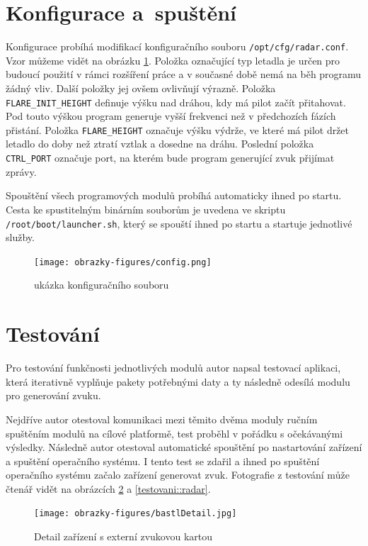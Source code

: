 	\section{Konfigurace a~spuštění}
	Konfigurace probíhá modifikací konfiguračního souboru \texttt{/opt/cfg/radar.conf}. Vzor můžeme vidět na obrázku \ref{implementace::config}. Položka označující typ letadla je určen pro budoucí použití v rámci rozšíření práce a v současné době nemá na běh programu žádný vliv. Další položky jej ovšem ovlivňují výrazně. Položka \texttt{FLARE\_INIT\_HEIGHT} definuje výšku nad dráhou, kdy má pilot začít přitahovat. Pod touto výškou program generuje vyšší frekvenci než v předchozích fázích přistání. Položka \texttt{FLARE\_HEIGHT} označuje výšku výdrže, ve které má pilot držet letadlo do doby než ztratí vztlak a dosedne na dráhu. Poslední položka \texttt{CTRL\_PORT} označuje port, na kterém bude program generující zvuk přijímat zprávy.\par
	Spouštění všech programových modulů probíhá automaticky ihned po startu. Cesta ke spustitelným binárním souborům je uvedena ve skriptu \texttt{/root/boot/launcher.sh}, který se spouští ihned po startu a startuje jednotlivé služby.
	
	\begin{figure}[H]
		\begin{center}
			\texttt{[image: obrazky-figures/config.png]}
			\caption{ukázka konfiguračního souboru}
			\label{implementace::config}
		\end{center}
	\end{figure}
	
	
	\section{Testování}
	Pro testování funkčnosti jednotlivých modulů autor napsal testovací aplikaci, která iterativně vyplňuje pakety potřebnými daty a ty následně odesílá modulu pro generování zvuku.\par
	Nejdříve autor otestoval komunikaci mezi těmito dvěma moduly ručním spuštěním modulů na cílové platformě, test proběhl v pořádku s očekávanými výsledky. Následně autor otestoval automatické spouštění po nastartování zařízení a spuštění operačního systému. I tento test se zdařil a ihned po spuštění operačního systému začalo zařízení generovat zvuk. Fotografie z testování může čtenář vidět na obrázcích \ref{testovani::bastl} a \ref{testovani::radar}.
	
	
	\begin{figure}[H]
		\begin{center}
			\texttt{[image: obrazky-figures/bastlDetail.jpg]}
			\caption{Detail zařízení s externí zvukovou kartou}
			\label{testovani::bastl}
		\end{center}
	\end{figure}
	
